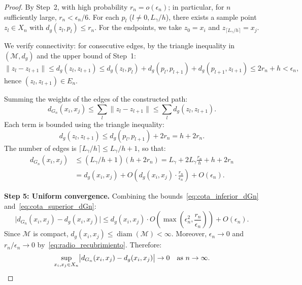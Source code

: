 \begin{proof}
	By Step~2, with high probability $r_n = o(\epsilon_n)$; in particular, for $n$ sufficiently large, $r_n < \epsilon_n/6$. For each $p_l$ ($l \neq 0, L_\gamma/h$), there exists a sample point $z_l \in X_n$ with $d_g(z_l, p_l) \leq r_n$. For the endpoints, we take $z_0 = x_i$ and $z_{\lceil L_\gamma/h \rceil} = x_j$.

	We verify connectivity: for consecutive edges, by the triangle inequality in $(\mathcal{M}, d_g)$ and the upper bound of Step~1:
	\[
	\|z_l - z_{l+1}\| \leq d_g(z_l, z_{l+1}) \leq d_g(z_l, p_l) + d_g(p_l, p_{l+1}) + d_g(p_{l+1}, z_{l+1}) \leq 2r_n + h < \epsilon_n,
	\]
	hence $(z_l, z_{l+1}) \in E_n$.

	Summing the weights of the edges of the constructed path:
	\[
	d_{G_n}(x_i, x_j) \leq \sum_l \|z_l - z_{l+1}\| \leq \sum_l d_g(z_l, z_{l+1}).
	\]
	Each term is bounded using the triangle inequality:
	\[
	d_g(z_l, z_{l+1}) \leq d_g(p_l, p_{l+1}) + 2r_n = h + 2r_n.
	\]
	The number of edges is $\lceil L_\gamma / h \rceil \leq L_\gamma/h + 1$, so that:
	\begin{equation}\label{eq:cota_superior_dGn}
	\begin{split}
	d_{G_n}(x_i, x_j) &\leq (L_\gamma/h + 1)(h + 2r_n) = L_\gamma + 2L_\gamma \frac{r_n}{h} + h + 2r_n \\
	&= d_g(x_i,x_j) + O\!\left(d_g(x_i,x_j) \cdot \frac{r_n}{\epsilon_n}\right) + O(\epsilon_n).
	\end{split}
	\end{equation}

	\textbf{Step 5: Uniform convergence.}
	Combining the bounds~\eqref{eq:cota_inferior_dGn} and~\eqref{eq:cota_superior_dGn}:
	\[
	\bigl|d_{G_n}(x_i, x_j) - d_g(x_i, x_j)\bigr| \leq d_g(x_i, x_j) \cdot O\!\left(\max\!\left(\epsilon_n^2, \frac{r_n}{\epsilon_n}\right)\right) + O(\epsilon_n).
	\]
	Since $\mathcal{M}$ is compact, $d_g(x_i, x_j) \leq \operatorname{diam}(\mathcal{M}) < \infty$. Moreover, $\epsilon_n \to 0$ and $r_n/\epsilon_n \to 0$ by~\eqref{eq:radio_recubrimiento}. Therefore:
	\[
	\sup_{x_i, x_j \in X_n} \bigl|d_{G_n}(x_i, x_j) - d_g(x_i, x_j)\bigr| \to 0 \quad \text{as } n \to \infty. \qedhere
	\]
\end{proof}

